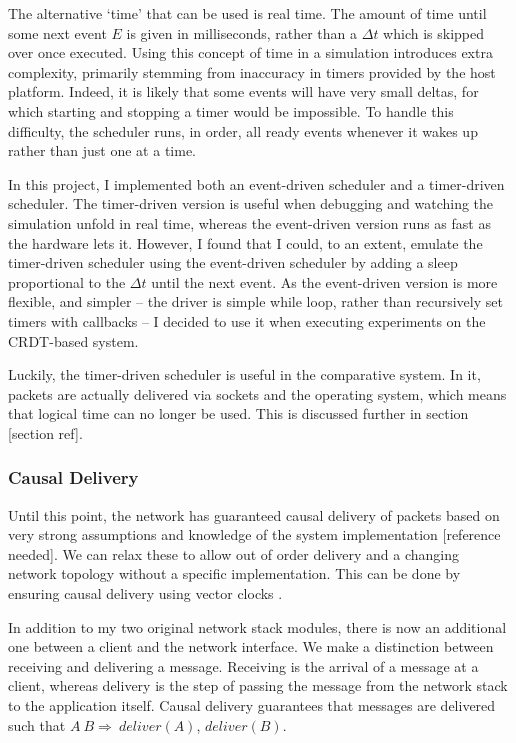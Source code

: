 \documentclass[12pt,a4paper,twoside,openright]{report}
\begin{document}
		The alternative `time' that can be used is real time. The amount of time until some next event $E$ is given in milliseconds, rather than a $\Delta t$ which is skipped over once executed. Using this concept of time in a simulation introduces extra complexity, primarily stemming from inaccuracy in timers provided by the host platform. Indeed, it is likely that some events will have very small deltas, for which starting and stopping a timer would be impossible. To handle this difficulty, the scheduler runs, in order, all ready events whenever it wakes up rather than just one at a time.
		
		In this project, I implemented both an event-driven scheduler and a timer-driven scheduler. The timer-driven version is useful when debugging and watching the simulation unfold in real time, whereas the event-driven version runs as fast as the hardware lets it. However, I found that I could, to an extent, emulate the timer-driven scheduler using the event-driven scheduler by adding a sleep proportional to the $\Delta t$ until the next event. As the event-driven version is more flexible, and simpler -- the driver is simple while loop, rather than recursively set timers with callbacks -- I decided to use it when executing experiments on the CRDT-based system.
		
		Luckily, the timer-driven scheduler is useful in the comparative system. In it, packets are actually delivered via sockets and the operating system, which means that logical time can no longer be used. This is discussed further in section [section ref].
		
		
		\subsubsection{Causal Delivery}
		Until this point, the network has guaranteed causal delivery of packets based on very strong assumptions and knowledge of the system implementation [reference needed]. We can relax these to allow out of order delivery and a changing network topology without a specific implementation. This can be done by ensuring causal delivery using vector clocks \cite{fidge1987}.
		
		In addition to my two original network stack modules, there is now an additional one between a client and the network interface. We make a distinction between receiving and delivering a message. Receiving is the arrival of a message at a client, whereas delivery is the step of passing the message from the network stack to the application itself. Causal delivery guarantees that messages are delivered such that $A \ B \Rightarrow\ deliver(A)$, $deliver(B)$.
		
\end{document}
